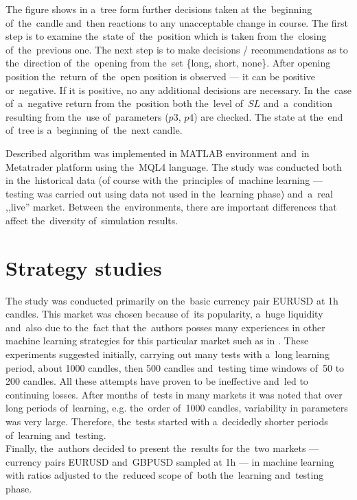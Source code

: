 \documentclass[runningheads,a4paper]{llncs}
\begin{document}
The figure shows in a~tree form further decisions taken at the~beginning of~the~candle and~then reactions to any unacceptable change in course. The first step is to examine the~state of~the~position which is taken from the~closing of~the~previous one. The next step is to make decisions / recommendations as to the~direction of~the~opening from the~set \{long, short, none\}. After opening position  the~return of~the~open position is observed --- it can be positive or~negative. If it is positive, no any additional decisions are necessary. In the~case of~a~negative return from the~position both the~level of~$SL$ and~a~condition resulting from the~use of~parameters ($p3$, $p4$) are checked. The state at the~end of~tree is a~beginning of~the~next candle.

Described algorithm was implemented in MATLAB environment and~in Metatrader platform using the~MQL4 language. The study was conducted both in the~historical data (of course with the~principles of~machine learning --- testing was carried out using data not used in the~learning phase) and~a~real ,,live'' market. Between the~environments, there are important differences that affect the~diversity of~simulation results.

\section{Strategy studies}
The study was conducted primarily on the~basic currency pair EURUSD at 1h candles. This market was chosen because of~its popularity, a~huge liquidity and~also due to the~fact that the~authors posses many experiences in other machine learning strategies for this particular market such as in \cite{Wilinski2014,Wilinski}. These experiments suggested initially, carrying out many tests with a~long learning period, about 1000 candles, then 500 candles and~testing time windows of~50 to 200 candles. All these attempts have proven to be ineffective and~led to continuing losses. After months of~tests in many markets it was noted that over long periods of~learning, e.g. the~order of~1000 candles, variability in parameters was very large. Therefore, the~tests started with a~decidedly shorter periods of~learning and~testing.\\

Finally, the~authors decided to present the~results for the~two markets --- currency pairs EURUSD and~GBPUSD sampled at 1h --- in machine learning with ratios adjusted to the~reduced scope of~both the~learning and~testing phase.\\
\end{document}
